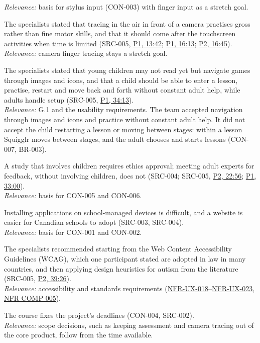 \documentclass[12pt]{article}
\renewcommand{\_}{\textunderscore\allowbreak}%
\newcommand{\intlink}[3]{\hyperref[int:#1-#2]{#3}}
\newcommand{\intref}[2]{\intlink{#1}{#2}{#1, #2}}
\newcommand{\reqref}[1]{\hyperref[req:#1]{#1}}
\begin{document}
\begin{description}[style=nextline]
\emph{Relevance:} basis for stylus input (CON-003) with finger input as a
stretch goal.
\item[FACT-006] The specialists stated that tracing in the air in front of a
camera practises gross rather than fine motor skills, and that it should come
after the touchscreen activities when time is limited (SRC-005,
\intref{P1}{13:42}; \intref{P1}{16:13}; \intref{P2}{16:45}).\\
\emph{Relevance:} camera finger tracing stays a stretch goal.
\item[FACT-007] The specialists stated that young children may not read yet but
navigate games through images and icons, and that a child should be able to
enter a lesson, practise, restart and move back and forth without constant adult
help, while adults handle setup (SRC-005, \intref{P1}{34:13}).\\
\emph{Relevance:} G.1 and the usability requirements. The team accepted
navigation through images and icons and practice without constant adult help.
It did not accept the child restarting a lesson or moving between stages: within
a lesson Squigglr moves between stages, and the adult chooses and starts lessons
(CON-007, BR-003).
\item[FACT-008] A study that involves children requires ethics approval; meeting
adult experts for feedback, without involving children, does not (SRC-004;
SRC-005, \intref{P2}{22:56}; \intref{P1}{33:00}).\\
\emph{Relevance:} basis for CON-005 and CON-006.
\item[FACT-009] Installing applications on school-managed devices is difficult,
and a website is easier for Canadian schools to adopt (SRC-003, SRC-004).\\
\emph{Relevance:} basis for CON-001 and CON-002.
\item[FACT-010] The specialists recommended starting from the Web Content
Accessibility Guidelines (WCAG), which one participant stated are adopted in law
in many countries, and then applying design heuristics for autism from the
literature (SRC-005, \intref{P2}{39:26}).\\
\emph{Relevance:} accessibility and standards requirements
(\reqref{NFR-UX-018}--\reqref{NFR-UX-023}, \reqref{NFR-COMP-005}).
\item[FACT-011] The course fixes the project's deadlines (CON-004, SRC-002).\\
\emph{Relevance:} scope decisions, such as keeping assessment and camera tracing
out of the core product, follow from the time available.

\end{description}
\end{document}
